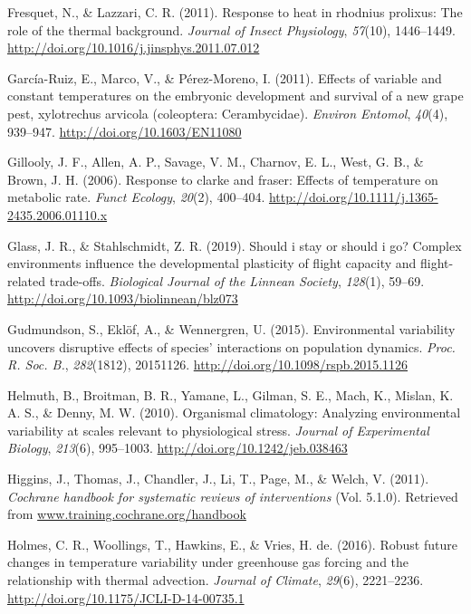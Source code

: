 \documentclass[12pt,twoside]{reedthesis}
\begin{document}
\leavevmode\hypertarget{ref-fresquet_response_2011}{}%
Fresquet, N., \& Lazzari, C. R. (2011). Response to heat in rhodnius prolixus: The role of the thermal background. \emph{Journal of Insect Physiology}, \emph{57}(10), 1446--1449. \url{http://doi.org/10.1016/j.jinsphys.2011.07.012}

\leavevmode\hypertarget{ref-garcia-ruiz_effects_2011}{}%
García-Ruiz, E., Marco, V., \& Pérez-Moreno, I. (2011). Effects of variable and constant temperatures on the embryonic development and survival of a new grape pest, xylotrechus arvicola (coleoptera: Cerambycidae). \emph{Environ Entomol}, \emph{40}(4), 939--947. \url{http://doi.org/10.1603/EN11080}

\leavevmode\hypertarget{ref-gillooly_response_2006}{}%
Gillooly, J. F., Allen, A. P., Savage, V. M., Charnov, E. L., West, G. B., \& Brown, J. H. (2006). Response to clarke and fraser: Effects of temperature on metabolic rate. \emph{Funct Ecology}, \emph{20}(2), 400--404. \url{http://doi.org/10.1111/j.1365-2435.2006.01110.x}

\leavevmode\hypertarget{ref-glass_should_2019}{}%
Glass, J. R., \& Stahlschmidt, Z. R. (2019). Should i stay or should i go? Complex environments influence the developmental plasticity of flight capacity and flight-related trade-offs. \emph{Biological Journal of the Linnean Society}, \emph{128}(1), 59--69. \url{http://doi.org/10.1093/biolinnean/blz073}

\leavevmode\hypertarget{ref-gudmundson_environmental_2015}{}%
Gudmundson, S., Eklöf, A., \& Wennergren, U. (2015). Environmental variability uncovers disruptive effects of species' interactions on population dynamics. \emph{Proc. R. Soc. B.}, \emph{282}(1812), 20151126. \url{http://doi.org/10.1098/rspb.2015.1126}

\leavevmode\hypertarget{ref-helmuth_organismal_2010}{}%
Helmuth, B., Broitman, B. R., Yamane, L., Gilman, S. E., Mach, K., Mislan, K. A. S., \& Denny, M. W. (2010). Organismal climatology: Analyzing environmental variability at scales relevant to physiological stress. \emph{Journal of Experimental Biology}, \emph{213}(6), 995--1003. \url{http://doi.org/10.1242/jeb.038463}

\leavevmode\hypertarget{ref-higgins_cochrane_2011}{}%
Higgins, J., Thomas, J., Chandler, J., Li, T., Page, M., \& Welch, V. (2011). \emph{Cochrane handbook for systematic reviews of interventions} (Vol. 5.1.0). Retrieved from \url{www.training.cochrane.org/handbook}

\leavevmode\hypertarget{ref-holmes_robust_2016}{}%
Holmes, C. R., Woollings, T., Hawkins, E., \& Vries, H. de. (2016). Robust future changes in temperature variability under greenhouse gas forcing and the relationship with thermal advection. \emph{Journal of Climate}, \emph{29}(6), 2221--2236. \url{http://doi.org/10.1175/JCLI-D-14-00735.1}
\end{document}
